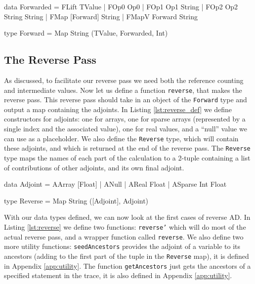     \begin{haskell}[caption=Forward pass data structures, label=lst:forward, gobble=8]
        data Forwarded
            = FLift TValue
            | FOp0  Op0
            | FOp1  Op1       String
            | FOp2  Op2       String String
            | FMap  [Forward] String
            | FMapV Forward   String

        type Forward = Map String (TValue, Forwarded, Int)
    \end{haskell}

    \subsection{The Reverse Pass}
        As discussed, to facilitate our reverse pass we need both the reference counting and intermediate values.
        Now let us define a function \texttt{reverse}, that makes the reverse pass.
        This reverse pass should take in an object of the \texttt{Forward} type and output a map containing the adjoints.
        In Listing \ref{lst:reverse_def} we define constructors for adjoints: one for arrays, one for sparse arrays (represented by a single index and the associated value), one for real values, and a ``null'' value we can use as a placeholder.
        We also define the \texttt{Reverse} type, which will contain these adjoints, and which is returned at the end of the reverse pass.
        The \texttt{Reverse} type maps the names of each part of the calculation to a 2-tuple containing a list of contributions of other adjoints, and its own final adjoint.

        \begin{haskell}[caption=Definition of the \texttt{Reverse} type, label=lst:reverse_def, gobble=12]
            data Adjoint
                = AArray  [Float]
                | ANull
                | AReal   Float
                | ASparse Int Float

            type Reverse = Map String ([Adjoint], Adjoint)
        \end{haskell}

        With our data types defined, we can now look at the first cases of reverse AD.
        In Listing \ref{lst:reverse} we define two functions: \texttt{reverse'} which will do most of the actual reverse pass, and a wrapper function called \texttt{reverse}.
        We also define two more utility functions: \texttt{seedAncestors} provides the adjoint of a variable to its ancestors (adding to the first part of the tuple in the \texttt{Reverse} map), it is defined in Appendix \ref{app:utility}.
        The function \texttt{getAncestors} just gets the ancestors of a specified statement in the trace, it is also defined in Appendix \ref{app:utility}.

